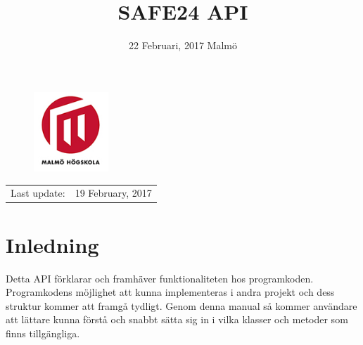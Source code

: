 \documentclass[11pt, numbers=endperiod]{report}
\title{SAFE24 API } %
\author{}%
\date{22 Februari, 2017 Malmö} %
\begin{document}
\begin{titlepage}


\clearpage\maketitle %
\thispagestyle{empty}

\begin{figure}[h!]
	\begin{center}
		\includegraphics[width=0.25\textwidth]{MAH_logotyp_original}
	\end{center}
\end{figure}

\begin{center}
\begin{tabular}{l r}
Last update: & 19 February, 2017 \\ %
\end{tabular}
\end{center}

\end{titlepage}

\clearpage


\tableofcontents

\thispagestyle{empty}\newpage
\setcounter{page}{1}


\section{Inledning}
Detta API förklarar och framhäver funktionaliteten hos programkoden. Programkodens möjlighet att kunna implementeras i andra projekt och dess struktur kommer att framgå tydligt. Genom denna manual så kommer användare att lättare kunna förstå och snabbt sätta sig in i vilka klasser och metoder som finns tillgängliga.\\
\end{document}
